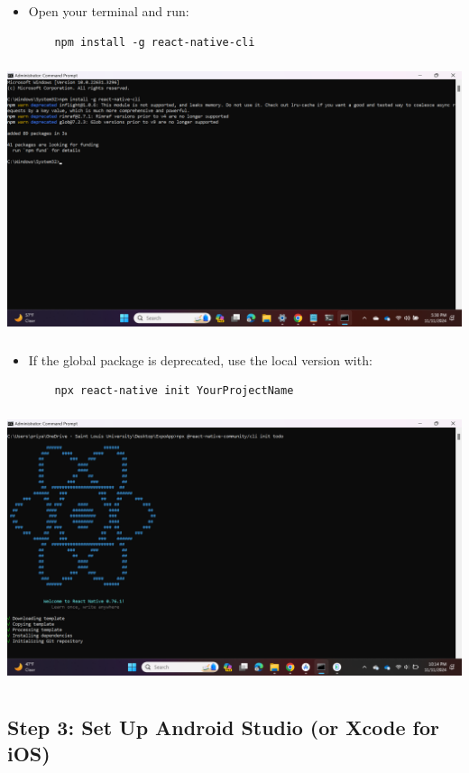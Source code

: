 \documentclass{article}
\begin{document}
\begin{itemize}
    \item Open your terminal and run:
    \begin{lstlisting}
    npm install -g react-native-cli
    \end{lstlisting}
\end{itemize}
\includegraphics[width=5.57813in,height=3.13391in]{media/image33.png}

\begin{itemize}
    \item If the global package is deprecated, use the local version with:
    \begin{lstlisting}
    npx react-native init YourProjectName
    \end{lstlisting}
\end{itemize}
\includegraphics[width=5.57813in,height=3.13391in]{media/image10.png}
    


\subsection*{Step 3: Set Up Android Studio (or Xcode for iOS)}
\end{document}
